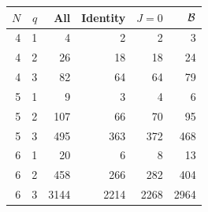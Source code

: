 \begin{center}
\begin{tabular}{rrrrrr}
\toprule
$N$ & $q$ & All & Identity & $J=0$ & $\mathcal B$\\
\midrule
4&1&4&2&2&3\\
4&2&26&18&18&24\\
4&3&82&64&64&79\\
5&1&9&3&4&6\\
5&2&107&66&70&95\\
5&3&495&363&372&468\\
6&1&20&6&8&13\\
6&2&458&266&282&404\\
6&3&3144&2214&2268&2964\\
\bottomrule
\end{tabular}
\end{center}
